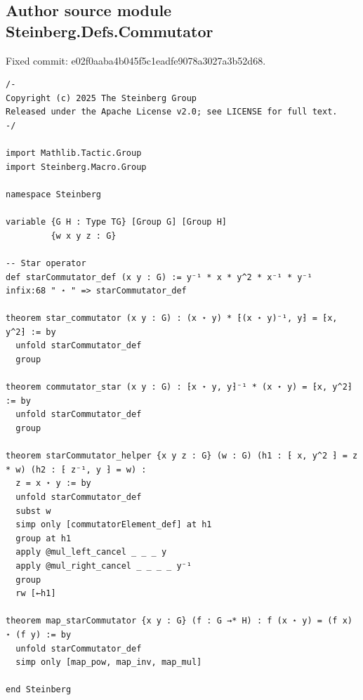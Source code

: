 \subsection*{Author source module Steinberg.Defs.Commutator}
\noindent Fixed commit: e02f0aaba4b045f5c1eadfe9078a3027a3b52d68.
\begin{Verbatim}
/-
Copyright (c) 2025 The Steinberg Group
Released under the Apache License v2.0; see LICENSE for full text.
-/

import Mathlib.Tactic.Group
import Steinberg.Macro.Group

namespace Steinberg

variable {G H : Type TG} [Group G] [Group H]
         {w x y z : G}

-- Star operator
def starCommutator_def (x y : G) := y⁻¹ * x * y^2 * x⁻¹ * y⁻¹
infix:68 " ⋆ " => starCommutator_def

theorem star_commutator (x y : G) : (x ⋆ y) * ⁅(x ⋆ y)⁻¹, y⁆ = ⁅x, y^2⁆ := by
  unfold starCommutator_def
  group

theorem commutator_star (x y : G) : ⁅x ⋆ y, y⁆⁻¹ * (x ⋆ y) = ⁅x, y^2⁆ := by
  unfold starCommutator_def
  group

theorem starCommutator_helper {x y z : G} (w : G) (h1 : ⁅ x, y^2 ⁆ = z * w) (h2 : ⁅ z⁻¹, y ⁆ = w) :
  z = x ⋆ y := by
  unfold starCommutator_def
  subst w
  simp only [commutatorElement_def] at h1
  group at h1
  apply @mul_left_cancel _ _ _ y
  apply @mul_right_cancel _ _ _ _ y⁻¹
  group
  rw [←h1]

theorem map_starCommutator {x y : G} (f : G →* H) : f (x ⋆ y) = (f x) ⋆ (f y) := by
  unfold starCommutator_def
  simp only [map_pow, map_inv, map_mul]

end Steinberg
\end{Verbatim}
